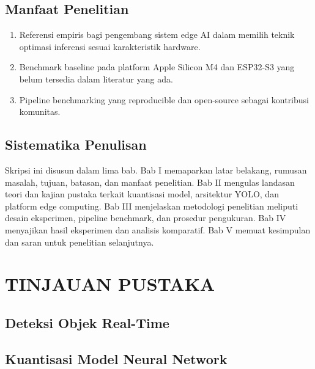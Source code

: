 \documentclass[12pt, a4paper]{report}
\begin{document}
\section{Manfaat Penelitian}

\begin{enumerate}
  \item Referensi empiris bagi pengembang sistem edge AI dalam memilih
    teknik optimasi inferensi sesuai karakteristik hardware.
  \item Benchmark baseline pada platform Apple Silicon M4 dan ESP32-S3
    yang belum tersedia dalam literatur yang ada.
  \item Pipeline benchmarking yang reproducible dan open-source
    sebagai kontribusi komunitas.
\end{enumerate}

\section{Sistematika Penulisan}

Skripsi ini disusun dalam lima bab. Bab I memaparkan latar belakang,
rumusan masalah, tujuan, batasan, dan manfaat penelitian.
Bab II mengulas landasan teori dan kajian pustaka terkait kuantisasi
model, arsitektur YOLO, dan platform edge computing.
Bab III menjelaskan metodologi penelitian meliputi desain eksperimen,
pipeline benchmark, dan prosedur pengukuran.
Bab IV menyajikan hasil eksperimen dan analisis komparatif.
Bab V memuat kesimpulan dan saran untuk penelitian selanjutnya.

\chapter{TINJAUAN PUSTAKA}

\section{Deteksi Objek Real-Time}


\section{Kuantisasi Model Neural Network}
\end{document}

